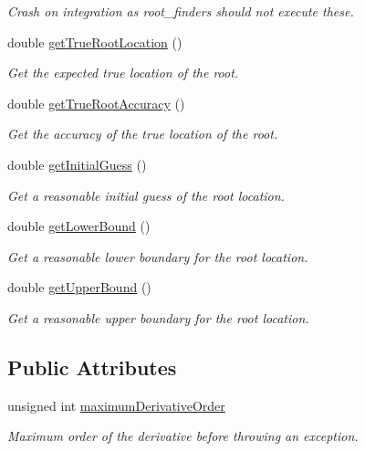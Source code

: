 \begin{DoxyCompactItemize}
\begin{DoxyCompactList}\small\item\em Crash on integration as root\+\_\+finders should not execute these. \end{DoxyCompactList}\item 
double \hyperlink{structtudat_1_1unit__tests_1_1TestFunctionWithZeroRoot_a83bc1022cbd4b289e6758b16f14f71f9}{get\+True\+Root\+Location} ()
\begin{DoxyCompactList}\small\item\em Get the expected true location of the root. \end{DoxyCompactList}\item 
double \hyperlink{structtudat_1_1unit__tests_1_1TestFunctionWithZeroRoot_a32707dd266f104e4675ef2ee2f4ab19f}{get\+True\+Root\+Accuracy} ()
\begin{DoxyCompactList}\small\item\em Get the accuracy of the true location of the root. \end{DoxyCompactList}\item 
double \hyperlink{structtudat_1_1unit__tests_1_1TestFunctionWithZeroRoot_a3166b71d7d7940ba58f6e029514abd87}{get\+Initial\+Guess} ()
\begin{DoxyCompactList}\small\item\em Get a reasonable initial guess of the root location. \end{DoxyCompactList}\item 
double \hyperlink{structtudat_1_1unit__tests_1_1TestFunctionWithZeroRoot_a93f4605ef8dd6141d573c005127972f1}{get\+Lower\+Bound} ()
\begin{DoxyCompactList}\small\item\em Get a reasonable lower boundary for the root location. \end{DoxyCompactList}\item 
double \hyperlink{structtudat_1_1unit__tests_1_1TestFunctionWithZeroRoot_ab46cce3a8b7b2c226e62f5f2267d4c63}{get\+Upper\+Bound} ()
\begin{DoxyCompactList}\small\item\em Get a reasonable upper boundary for the root location. \end{DoxyCompactList}\end{DoxyCompactItemize}
\subsection*{Public Attributes}
\begin{DoxyCompactItemize}
\item 
unsigned int \hyperlink{structtudat_1_1unit__tests_1_1TestFunctionWithZeroRoot_ab30f3e9dad0f35e6dc60143efda63df3}{maximum\+Derivative\+Order}\hypertarget{structtudat_1_1unit__tests_1_1TestFunctionWithZeroRoot_ab30f3e9dad0f35e6dc60143efda63df3}{}\label{structtudat_1_1unit__tests_1_1TestFunctionWithZeroRoot_ab30f3e9dad0f35e6dc60143efda63df3}

\begin{DoxyCompactList}\small\item\em Maximum order of the derivative before throwing an exception. \end{DoxyCompactList}\end{DoxyCompactItemize}

